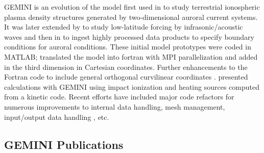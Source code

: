 \documentclass[11pt,letterpaper]{article}
\begin{document}
GEMINI is an evolution of the model first used in \citet{Zettergren:2012} to study terrestrial ionospheric plasma density structures generated by two-dimensional auroral current systems.  It was later extended by \citet{Zettergren:2013} to study low-latitude forcing by infrasonic/acoustic waves and then in \citet{Zettergren:2014} to ingest highly processed data products to specify boundary conditions for auroral conditions.  These initial model prototypes were coded in MATLAB; \citet{Zettergren:2015b} translated the model into fortran with MPI parallelization and added in the third dimension in Cartesian coordinates.  Further enhancements to the Fortran code to include general orthogonal curvilinear coordinates \citep{Zettergren:2019}.  \citet{Diaz:2021} presented calculations with GEMINI using impact ionization and heating sources computed from a kinetic code.  Recent efforts have included major code refactors for numerous improvements to internal data handling, mesh management, input/output data handling \citep{Clayton:2021}, etc. 

\subsection{GEMINI Publications}
\end{document}
